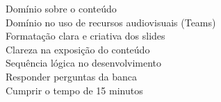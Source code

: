 \documentclass[preview]{standalone}
\begin{document}
Domínio sobre o conteúdo\\Domínio no uso de recursos audiovisuais (Teams)\\Formatação clara e criativa dos slides\\Clareza na exposição do conteúdo\\Sequência lógica no desenvolvimento\\Responder perguntas da banca\\Cumprir o tempo de 15 minutos\\
\end{document}
